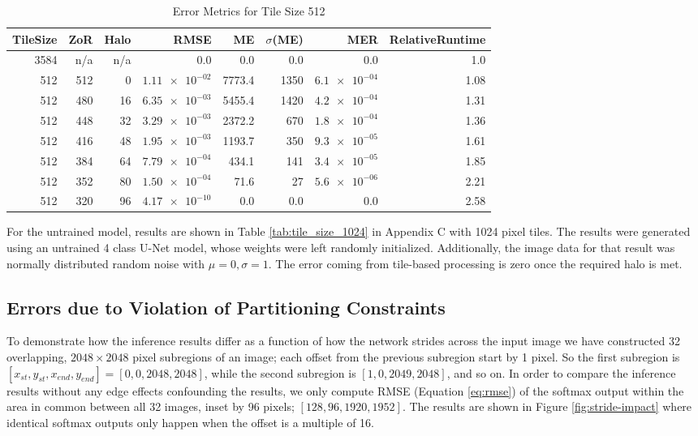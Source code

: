 \documentclass[10pt, indentfirst]{article}
\begin{document}
\begin{table}
	\centering
	\caption{Error Metrics for Tile Size 512}
	\label{tab:tile_size_512}
	\begin{tabular}{r|r|r|r|r|r|r|r}
		TileSize & ZoR & Halo & RMSE    & ME & $\sigma$(ME) & MER & RelativeRuntime \\ 
		\hline
		3584 & n/a & n/a & 0.0 & 0.0 & 0.0 & 0.0 & 1.0 \\
		512 & 512 & 0 & $\num{1.11e-02}$ & 7773.4 & 1350 & $\num{6.1e-04}$ & 1.08 \\
		512 & 480 & 16 & $\num{6.35e-03}$ & 5455.4 & 1420 & $\num{4.2e-04}$ & 1.31 \\
		512 & 448 & 32 & $\num{3.29e-03}$ & 2372.2 & 670 & $\num{1.8e-04}$ & 1.36 \\
		512 & 416 & 48 & $\num{1.95e-03}$ & 1193.7 & 350 & $\num{9.3e-05}$ & 1.61 \\
		512 & 384 & 64 & $\num{7.79e-04}$ & 434.1 & 141 &$\num{3.4e-05}$ & 1.85 \\
		512 & 352 & 80 & $\num{1.50e-04}$ & 71.6 & 27 & $\num{5.6e-06}$ & 2.21 \\
		512 & 320 & 96 & $\num{4.17e-10}$ & 0.0 & 0.0 & 0.0 & 2.58 \\
	\end{tabular}
\end{table}

For the untrained model, results are shown in Table \ref{tab:tile_size_1024} in Appendix C with 1024 pixel tiles. The results were generated using an untrained 4 class U-Net model, whose weights were left randomly initialized. Additionally, the image data for that result was normally distributed random noise with $\mu = 0, \sigma = 1$. The error coming from tile-based processing is zero once the required halo is met.


\subsection{Errors due to Violation of Partitioning Constraints}

To demonstrate how the inference results differ as a function of how the network strides across the input image we have constructed 32 overlapping, $2048 \times 2048$ pixel subregions of an image; each offset from the previous subregion start by 1 pixel. So the first subregion is $[x_{st}, y_{st}, x_{end}, y_{end}] = [0, 0, 2048, 2048]$, while the second subregion is $[1, 0, 2049, 2048]$, and so on. In order to compare the inference results without any edge effects confounding the results, we only compute RMSE (Equation \ref{eq:rmse}) of the softmax output within the area in common between all 32 images, inset by 96 pixels; $[128, 96, 1920, 1952]$. The results are shown in Figure \ref{fig:stride-impact} where identical softmax outputs only happen when the offset is a multiple of 16.
\end{document}
